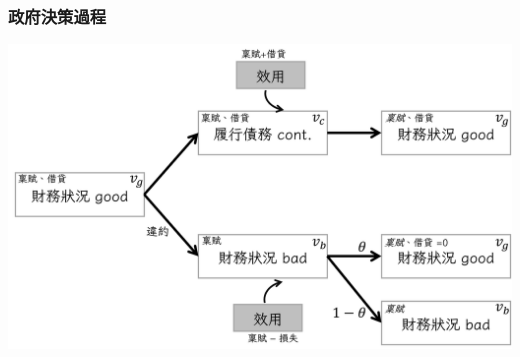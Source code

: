 \documentclass[mathserif]{beamer}
\begin{document}
    \begin{frame}[label = {vf}]
        \frametitle{政府決策過程}
        \includegraphics[width = \textwidth]{fig/value_fucntion_flow_v2.png}
    \end{frame}
\end{document}
